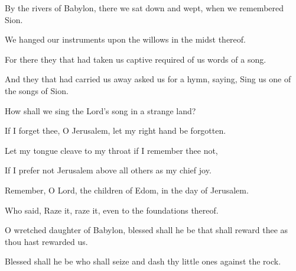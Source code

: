 By the rivers of Babylon, there we sat down and wept, when we remembered Sion.

We hanged our instruments upon the willows in the midst thereof.

For there they that had taken us captive required of us words of a song.

And they that had carried us away asked us for a hymn, saying, Sing us one of the songs of Sion.

How shall we sing the Lord's song in a strange land?

If I forget thee, O Jerusalem, let my right hand be forgotten.

Let my tongue cleave to my throat if I remember thee not,

If I prefer not Jerusalem above all others as my chief joy.

Remember, O Lord, the children of Edom, in the day of Jerusalem.

Who said, Raze it, raze it, even to the foundations thereof.

O wretched daughter of Babylon, blessed shall he be that shall reward thee as thou hast rewarded us.

Blessed shall he be who shall seize and dash thy little ones against the rock.
